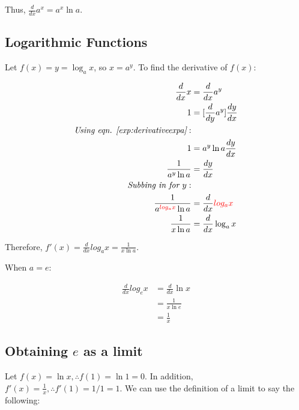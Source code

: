 \documentclass[12pt]{article}
\begin{document}
Thus, $\frac{d}{dx} a^x = a^x \ln a$.

\subsection{Logarithmic Functions}

Let $f(x) = y = \log_a{x}$, so $x = a^y$. To find the derivative of $f(x)$:

\begin{equation}
    \begin{split}
        \frac{d}{dx} x &= \frac{d}{dx} a^y\\
        1 &= [\frac{d}{dy} a^y] \frac{dy}{dx}\\
        \textit{Using eqn. \ref{exp:derivativeexpa}}:\\
        1 &= a^y \ln a \frac{dy}{dx}\\
        \frac{1}{a^y \ln a} &= \frac{dy}{dx}\\
        \textit{Subbing in for $y$}:\\
        \frac{1}{a^{\textcolor{red}{log_a{x}}} \ln a} &= \frac{d}{dx} \textcolor{red}{log_a{x}}\\
        \frac{1}{x \ln a} &= \frac{d}{dx} \log_a{x}
    \end{split}
\end{equation}

Therefore, $f'(x) = \frac{d}{dx} log_a{x} = \frac{1}{x \ln a}$.

When $a = e$:

\begin{equation}
    \begin{split}
        \frac{d}{dx} log_e{x} &= \frac{d}{dx} \ln x\\
        &= \frac{1}{x \ln e} \\
        &= \frac{1}{x}
    \end{split}
\end{equation}

\subsection{Obtaining \texorpdfstring{$e$}{Euler's number} as a limit}

Let $f(x) = \ln x, \therefore f(1) = \ln 1 = 0$. In addition, $f'(x) = \frac{1}{x}, \therefore f'(1) = 1/1 = 1$. We can use the definition of a limit to say the following:
\end{document}
